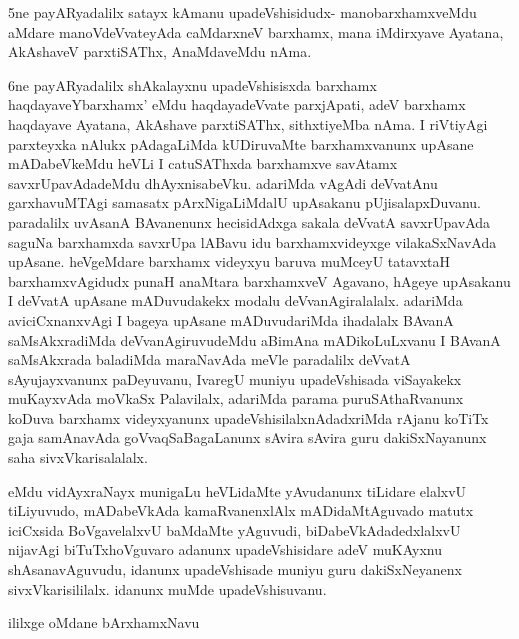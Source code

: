 \begin{artha}
5ne payARyadalilx satayx kAmanu upadeVshisidudx- manobarxhamxveMdu aMdare manoVdeVvateyAda caMdarxneV barxhamx, mana iMdirxyave Ayatana, AkAshaveV parxtiSAThx, AnaMdaveMdu nAma. 
\end{artha}

\begin{artha}
6ne payARyadalilx shAkalayxnu upadeVshisisxda barxhamx haqdayaveYbarxhamx' eMdu haqdayadeVvate parxjApati, adeV barxhamx haqdayave Ayatana, AkAshave parxtiSAThx, sithxtiyeMba nAma. I riVtiyAgi parxteyxka nAlukx pAdagaLiMda kUDiruvaMte barxhamxvanunx upAsane mADabeVkeMdu heVLi I catuSAThxda barxhamxve savAtamx savxrUpavAdadeMdu dhAyxnisabeVku. adariMda vAgAdi deVvatAnu garxhavuMTAgi samasatx pArxNigaLiMdalU upAsakanu pUjisalapxDuvanu. paradalilx uvAsanA BAvanenunx hecisidAdxga sakala deVvatA savxrUpavAda saguNa barxhamxda savxrUpa lABavu idu barxhamxvideyxge vilakaSxNavAda upAsane. heVgeMdare barxhamx videyxyu baruva muMceyU tatavxtaH barxhamxvAgidudx punaH anaMtara barxhamxveV Agavano, hAgeye upAsakanu I deVvatA upAsane mADuvudakekx modalu deVvanAgiralalalx. adariMda aviciCxnanxvAgi I bageya upAsane mADuvudariMda ihadalalx BAvanA saMsAkxradiMda deVvanAgiruvudeMdu aBimAna mADikoLuLxvanu I BAvanA saMsAkxrada baladiMda maraNavAda meVle paradalilx deVvatA sAyujayxvanunx paDeyuvanu, IvaregU muniyu upadeVshisada viSayakekx muKayxvAda moVkaSx Palavilalx, adariMda parama puruSAthaRvanunx koDuva barxhamx videyxyanunx upadeVshisilalxnAdadxriMda rAjanu koTiTx gaja samAnavAda goVvaqSaBagaLanunx sAvira sAvira guru dakiSxNayanunx saha sivxVkarisalalalx. 
\end{artha}%


\begin{artha}
\stext eMdu vidAyxraNayx munigaLu heVLidaMte yAvudanunx tiLidare elalxvU tiLiyuvudo, mADabeVkAda kamaRvanenxlAlx mADidaMtAguvado matutx iciCxsida BoVgavelalxvU baMdaMte yAguvudi, biDabeVkAdadedxlalxvU nijavAgi biTuTxhoVguvaro adanunx upadeVshisidare adeV muKAyxnu shAsanavAguvudu, idanunx upadeVshisade muniyu guru dakiSxNeyanenx sivxVkarisililalx. idanunx muMde upadeVshisuvanu. 
\end{artha}

\begin{center}
ililxge oMdane bArxhamxNavu
\end{center}


